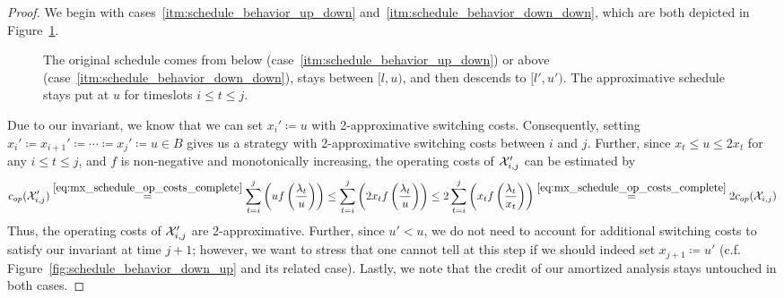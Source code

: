 \begin{proof}
We begin with cases~\ref{itm:schedule_behavior_up_down} and~\ref{itm:schedule_behavior_down_down}, which are both depicted in Figure~\ref{fig:schedule_behavior_down}.
\begin{figure}[ht]
\captionsetup[subfigure]{labelformat=empty}
\begin{subfigure}[b]{0.49\textwidth}

\end{subfigure}
\hfill
\begin{subfigure}[b]{0.49\textwidth}

\end{subfigure}
\caption{The original schedule comes from below (case~\ref{itm:schedule_behavior_up_down}) or above (case~\ref{itm:schedule_behavior_down_down}), stays between $[l,u)$, and then descends to $[l',u')$. The approximative schedule stays put at $u$ for timeslots $i\le t\le j$.}
\label{fig:schedule_behavior_down}
\end{figure}
Due to our invariant, we know that we can set $x_i'\coloneqq u$ with 2-approximative switching costs. Consequently, setting $x_i'\coloneqq x_{i+1}'\coloneqq\dotsb\coloneqq x_j'\coloneqq u\in B$ gives us a strategy with 2-approximative switching costs between $i$ and $j$. Further, since $x_t\le u\le2x_t$ for any $i\le t\le j$, and $f$ is non-negative and monotonically increasing, the operating costs of $\mathcal{X}'_{i,j}$ can be estimated by
\begin{equation*}
	c_{op}(\mathcal{X}_{i,j}')\stackrel{\eqref{eq:mx_schedule_op_costs_complete}}{=}\sum\limits_{t=i}^j\left(uf\left(\frac{\lambda_t}{u}\right)\right)\le\sum\limits_{t=i}^j\left(2x_tf\left(\frac{\lambda_t}{u}\right)\right)\le2\sum\limits_{t=i}^j\left(x_tf\left(\frac{\lambda_t}{x_t}\right)\right)\stackrel{\eqref{eq:mx_schedule_op_costs_complete}}{=}2c_{op}(\mathcal{X}_{i,j})
\end{equation*}
Thus, the operating costs of $\mathcal{X}_{i,j}'$ are 2-approximative. Further, since $u'<u$, we do not need to account for additional switching costs to satisfy our invariant at time $j+1$; however, we want to stress that one cannot tell at this step if we should indeed set $x_{j+1}\coloneqq u'$ (c.f. Figure~\ref{fig:schedule_behavior_down_up} and its related case). Lastly, we note that the credit of our amortized analysis stays untouched in both cases.
	

\end{proof}
